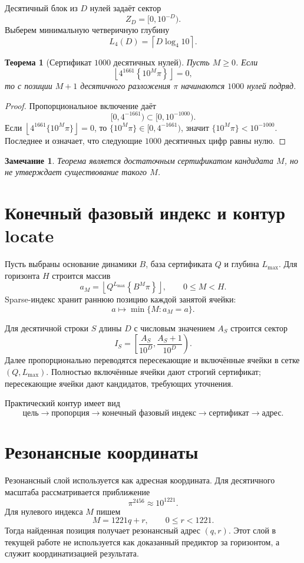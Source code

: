 \documentclass[11pt,a4paper]{article}
\newtheorem{theorem}{Теорема}
\newtheorem{remark}{Замечание}
\newcommand{\fracpart}[1]{\left\{#1\right\}}
\newcommand{\floor}[1]{\left\lfloor #1 \right\rfloor}
\begin{document}
Десятичный блок из $D$ нулей задаёт сектор
\[
  Z_D=[0,10^{-D}).
\]
Выберем минимальную четверичную глубину
\[
  L_4(D)=\left\lceil D\log_4 10\right\rceil.
\]

\begin{theorem}[Сертификат $1000$ десятичных нулей]
Пусть $M\ge0$.  Если
\[
  \floor{4^{1661}\fracpart{10^M\pi}}=0,
\]
то с позиции $M+1$ десятичного разложения $\pi$ начинаются $1000$ нулей подряд.
\end{theorem}

\begin{proof}
Пропорциональное включение даёт
\[
  [0,4^{-1661})\subset[0,10^{-1000}).
\]
Если $\floor{4^{1661}\{10^M\pi\}}=0$, то $\{10^M\pi\}\in[0,4^{-1661})$, значит $\{10^M\pi\}<10^{-1000}$. Последнее и означает, что следующие $1000$ десятичных цифр равны нулю.
\end{proof}

\begin{remark}
Теорема является достаточным сертификатом кандидата $M$, но не утверждает существование такого $M$.
\end{remark}

\section{Конечный фазовый индекс и контур locate}

Пусть выбраны основание динамики $B$, база сертификата $Q$ и глубина $L_{\max}$.  Для горизонта $H$ строится массив
\[
  a_M=\floor{Q^{L_{\max}}\fracpart{B^M\pi}},\qquad 0\le M<H.
\]
Sparse-индекс хранит раннюю позицию каждой занятой ячейки:
\[
  a\mapsto \min\{M:a_M=a\}.
\]

Для десятичной строки $S$ длины $D$ с числовым значением $A_S$ строится сектор
\[
  I_S=\left[\frac{A_S}{10^D},\frac{A_S+1}{10^D}\right).
\]
Далее пропорционально переводятся пересекающие и включённые ячейки в сетке $(Q,L_{\max})$.  Полностью включённые ячейки дают строгий сертификат; пересекающие ячейки дают кандидатов, требующих уточнения.

Практический контур имеет вид
\[
  \text{цель}\to\text{пропорция}\to\text{конечный фазовый индекс}\to\text{сертификат}\to\text{адрес}.
\]

\section{Резонансные координаты}

Резонансный слой используется как адресная координата.  Для десятичного масштаба рассматривается приближение
\[
  \pi^{2456}\approx 10^{1221}.
\]
Для нулевого индекса $M$ пишем
\[
  M=1221q+r,
  \qquad 0\le r<1221.
\]
Тогда найденная позиция получает резонансный адрес $(q,r)$.  Этот слой в текущей работе не используется как доказанный предиктор за горизонтом, а служит координатизацией результата.
\end{document}
